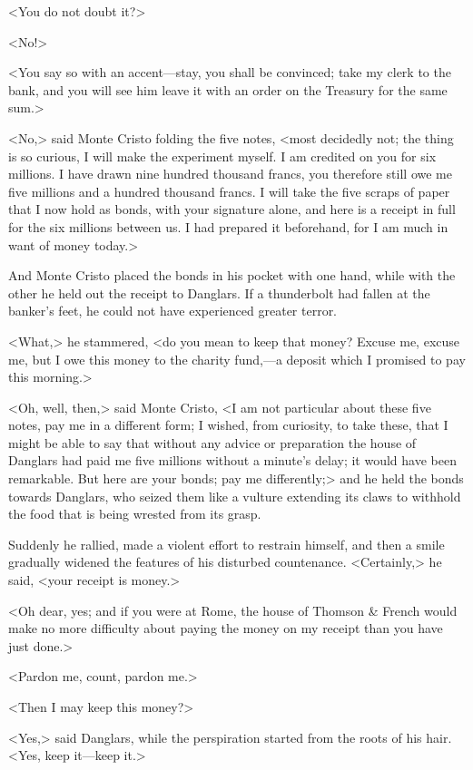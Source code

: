 <You do not doubt it?> 

 <No!> 

 <You say so with an accent—stay, you shall be convinced; take my clerk to the bank, and you will see him leave it with an order on the Treasury for the same sum.> 

 <No,> said Monte Cristo folding the five notes, <most decidedly not; the thing is so curious, I will make the experiment myself. I am credited on you for six millions. I have drawn nine hundred thousand francs, you therefore still owe me five millions and a hundred thousand francs. I will take the five scraps of paper that I now hold as bonds, with your signature alone, and here is a receipt in full for the six millions between us. I had prepared it beforehand, for I am much in want of money today.> 

 And Monte Cristo placed the bonds in his pocket with one hand, while with the other he held out the receipt to Danglars. If a thunderbolt had fallen at the banker's feet, he could not have experienced greater terror. 

 <What,> he stammered, <do you mean to keep that money? Excuse me, excuse me, but I owe this money to the charity fund,—a deposit which I promised to pay this morning.> 

 <Oh, well, then,> said Monte Cristo, <I am not particular about these five notes, pay me in a different form; I wished, from curiosity, to take these, that I might be able to say that without any advice or preparation the house of Danglars had paid me five millions without a minute's delay; it would have been remarkable. But here are your bonds; pay me differently;> and he held the bonds towards Danglars, who seized them like a vulture extending its claws to withhold the food that is being wrested from its grasp. 

 Suddenly he rallied, made a violent effort to restrain himself, and then a smile gradually widened the features of his disturbed countenance.  <Certainly,> he said, <your receipt is money.> 

 <Oh dear, yes; and if you were at Rome, the house of Thomson \& French would make no more difficulty about paying the money on my receipt than you have just done.> 

 <Pardon me, count, pardon me.> 

 <Then I may keep this money?> 

 <Yes,> said Danglars, while the perspiration started from the roots of his hair. <Yes, keep it—keep it.> 

